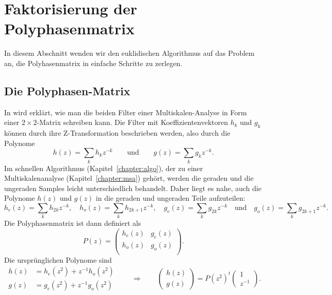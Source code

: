 %
%
\section{Faktorisierung der Polyphasenmatrix}
In diesem Abschnitt wenden wir den euklidischen Algorithmus auf das
Problem an, die Polyhasenmatrix in einfache Schritte zu zerlegen.

\subsection{Die Polyphasen-Matrix}
In \cite{fpga:Daubechies1998} wird erklärt, wie man die beiden
Filter einer Multiskalen-Analyse in Form einer $2\times 2$-Matrix
schreiben kann.
Die Filter mit Koeffizientenvektoren $h_k$ und $g_k$ können durch 
ihre Z-Transformation beschrieben werden, also durch die Polynome
\[
h(z) = \sum_{k} h_kz^{-k}
\qquad\text{und}\qquad
g(z) = \sum_{k} g_kz^{-k}.
\]
Im schnellen Algorithmus (Kapitel~\ref{chapter:algo}), der zu einer
Multiskalenanalyse (Kapitel~\ref{chapter:msa}) gehört, werden die
geraden und die ungeraden Samples leicht unterschiedlich behandelt.
Daher liegt es nahe, auch die Polynome $h(z)$ und $g(z)$ in die
geraden und ungeraden Teile aufzuteilen:
\[
h_e(z) = \sum_k h_{2k}z^{-k},
\quad
h_o(z) = \sum_k h_{2k+1}z^{-k},
\quad
g_e(z) = \sum_k g_{2k}z^{-k}
\quad\text{und}\quad
g_o(z) = \sum_k g_{2k+1}z^{-k}.
\]
Die Polyphasenmatrix ist dann definiert als
\[
P(z)
=
\begin{pmatrix}
h_e(z)&g_e(z)\\
h_o(z)&g_o(z)\\
\end{pmatrix}.
\]
Die ursprünglichen Polynome sind
\[
\begin{aligned}
h(z) &= h_e(z^2) + z^{-1}h_o(z^2)\\
g(z) &= g_e(z^2) + z^{-1}g_o(z^2)
\end{aligned}
\qquad\Rightarrow\qquad
\begin{pmatrix}
h(z)\\
g(z)
\end{pmatrix}
=
P(z^2)^t
\begin{pmatrix} 1\\ z^{-1} \end{pmatrix}.
\]

